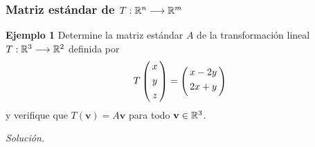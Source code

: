 \begin{frame}\frametitle{Matriz estándar de $T:\mathbb{R}^n\longrightarrow\mathbb{R}^m$}

\begin{ej}{\textbf{Ejemplo 1}}
	\justifying
	Determine la matriz estándar $A$ de la transformación lineal  $T:\mathbb{R}^3\longrightarrow\mathbb{R}^2$ definida por 
		\[
	T
	\left(
	\begin{array}{@{\hspace{0.3\tabcolsep}}c@{\hspace{0.3\tabcolsep}}}
	x  \\[1mm]
	y  \\[1mm]
	z
	\end{array}
	\right)
	=
	\left(
	\begin{array}{@{\hspace{0.3\tabcolsep}}c@{\hspace{0.3\tabcolsep}}}
	x-2y  \\[1mm]
	2x+y \\[1mm]
	\end{array}
	\right)
	\]
	y verifique que $T(\mathbf{v})=A\mathbf{v}$ para todo $\mathbf{v}\in\mathbb{R}^3$.
\end{ej}
\textit{Solución.}

\end{frame}


\subsection{}

